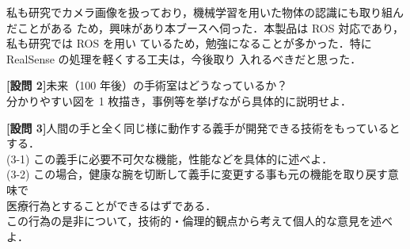 \documentclass{jsarticle}
\begin{document}
\hspace*{5.7zw}私も研究でカメラ画像を扱っており，機械学習を用いた物体の認識にも取り組んだことがある
\hspace*{6.7zw}ため，興味があり本ブースへ伺った．本製品は ROS 対応であり，私も研究では ROS を用い
\hspace*{6.7zw}ているため，勉強になることが多かった．特に RealSense の処理を軽くする工夫は，今後取り
\hspace*{6.7zw}入れるべきだと思った．

\newpage

\textbf{{[設問 2]}}\hspace*{1zw}未来（100 年後）の手術室はどうなっているか？\\
\hspace*{5.7zw}分かりやすい図を 1 枚描き，事例等を挙げながら具体的に説明せよ．\\


\newpage

\textbf{{[設問 3]}}\hspace*{1zw}人間の手と全く同じ様に動作する義手が開発できる技術をもっているとする．\\
\hspace*{5.7zw}(3-1) この義手に必要不可欠な機能，性能などを具体的に述べよ．\\

\hspace*{4.7zw}(3-2) この場合，健康な腕を切断して義手に変更する事も元の機能を取り戻す意味で\\
\hspace*{8.4zw}医療行為とすることができるはずである．\\
\hspace*{8.4zw}この行為の是非について，技術的・倫理的観点から考えて個人的な意見を述べよ．\\
\end{document}

